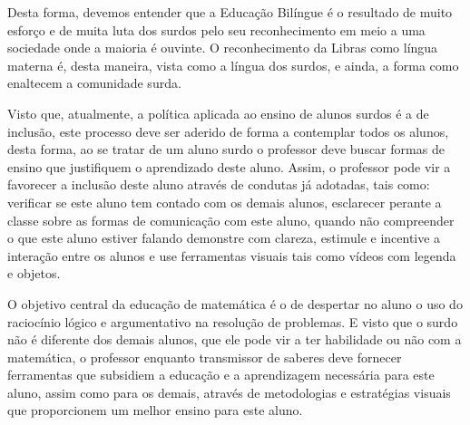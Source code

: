 \documentclass[brasil]{abnt}
\begin{document}
	Desta forma, devemos entender que a Educação Bilíngue é o resultado de muito esforço e de muita luta dos surdos pelo seu reconhecimento em meio a uma sociedade onde a maioria é ouvinte. O reconhecimento da
	Libras como língua materna é, desta maneira, vista como a língua dos surdos, e ainda, a forma como enaltecem a comunidade surda. 
	
	    
	
	Visto que, atualmente, a política aplicada ao ensino de alunos surdos é a de inclusão, este processo deve ser aderido de forma a contemplar todos os alunos, desta forma, ao se tratar de um aluno surdo o professor deve buscar formas de ensino que justifiquem o aprendizado deste aluno.
	Assim, o professor pode vir a favorecer a inclusão deste aluno através de condutas já adotadas, tais como: verificar se este aluno tem contado com os demais alunos, esclarecer perante a 
	classe sobre as formas de comunicação com este aluno, quando não compreender o que este aluno estiver falando demonstre com clareza, estimule e incentive a interação entre os alunos e use ferramentas 
	visuais tais como vídeos com legenda e objetos.        
	
	O objetivo central da educação de matemática é o de despertar no aluno o uso do raciocínio lógico e argumentativo na resolução de problemas. E visto que o surdo não é diferente dos demais alunos, que ele pode vir a 
	ter habilidade ou não com a matemática, o professor enquanto transmissor de saberes deve fornecer ferramentas que subsidiem a educação e a aprendizagem necessária para este aluno, assim como para os demais, através
	de metodologias e estratégias visuais que proporcionem um melhor ensino para este aluno. 
  
  

	\nocite{aud}
	\nocite{coch}
	\nocite{crist}
	\nocite{audi}
	\nocite{vs}
	\nocite{phs}
	\nocite{qes}
	\nocite{s}
	\nocite{fil}
	\nocite{bev}
	\nocite{bot}
	\nocite{l1}
	\nocite{l2}
	\nocite{l3}
	\nocite{l4}
	\nocite{l5}
	\nocite{l6}
	\nocite{capo}
	\nocite{car}
	\nocite{cr}
	\nocite{Ubi}
	\nocite{dec}
	\nocite{fa}
	\nocite{gold}
	\nocite{lacerd}
	\nocite{lei}
	\nocite{lip}
	\nocite{machado}
	\nocite{PC}
	\nocite{macha}
	\nocite{mm}
	\nocite{mon}
	\nocite{nogu}
	\nocite{nunes}
	\nocite{oliveira}
	\nocite{Paul}
	\nocite{jur}
	\nocite{pei}
	\nocite{crist}
	\nocite{quas}
	\nocite{qua}
	\nocite{qep}
	\nocite{quads}
	\nocite{rodr}
	\nocite{sado}
	\nocite{Sales}
	\nocite{sal}
	\nocite{san}
	\nocite{sp}
	\nocite{ei}
	\nocite{silva}
	\nocite{soares}
	\nocite{sou}
  
\end{document}

